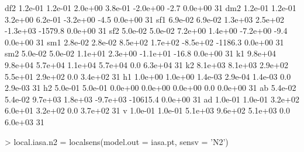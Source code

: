 \documentclass[a4paper]{article}
\begin{document}
\begin{Schunk}
\begin{Soutput}
df2 1.2e-01 1.2e-01 2.0e+00 3.8e-01 -2.0e+00     -2.7 0.0e+00 31
dm2 1.2e-01 1.2e-01 3.2e+00 6.2e-01 -3.2e+00     -4.5 0.0e+00 31
sf1 6.9e-02 6.9e-02 1.3e+03 2.5e+02 -1.3e+03  -1579.8 0.0e+00 31
sf2 5.0e-02 5.0e-02 7.2e+00 1.4e+00 -7.2e+00     -9.4 0.0e+00 31
sm1 2.8e-02 2.8e-02 8.5e+02 1.7e+02 -8.5e+02  -1186.3 0.0e+00 31
sm2 5.0e-02 5.0e-02 1.1e+01 2.3e+00 -1.1e+01    -16.8 0.0e+00 31
k1  9.8e+04 9.8e+04 5.7e+04 1.1e+04  5.7e+04      0.0 6.3e+04 31
k2  8.1e+03 8.1e+03 2.9e+02 5.5e+01  2.9e+02      0.0 3.4e+02 31
h1  1.0e+00 1.0e+00 1.4e-03 2.9e-04  1.4e-03      0.0 2.9e-03 31
h2  5.0e-01 5.0e-01 0.0e+00 0.0e+00  0.0e+00      0.0 0.0e+00 31
ab  5.4e-02 5.4e-02 9.7e+03 1.8e+03 -9.7e+03 -10615.4 0.0e+00 31
ad  1.0e-01 1.0e-01 3.2e+02 6.0e+01  3.2e+02      0.0 3.7e+02 31
v   1.0e-01 1.0e-01 5.1e+03 9.6e+02  5.1e+03      0.0 6.0e+03 31
\end{Soutput}
\begin{Sinput}
> local.iasa.n2 = localsens(model.out = iasa.pt, sensv = 'N2')
\end{Sinput}
\end{Schunk}
\end{document}
